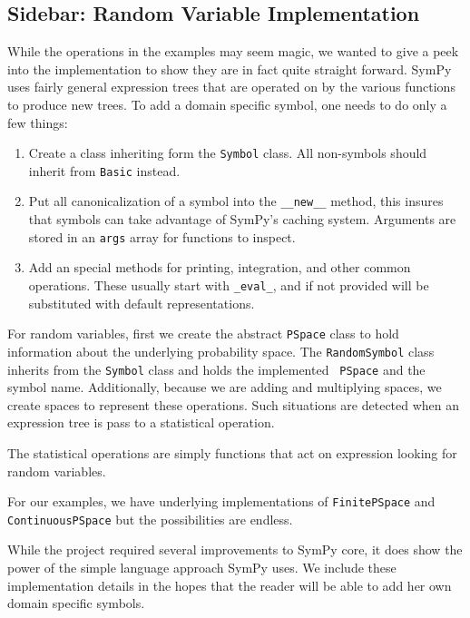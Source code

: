 \subsection{Sidebar: Random Variable Implementation}

While the operations in the examples may seem magic, we wanted to give a peek
into the implementation to show they are in fact quite straight forward. SymPy
uses fairly general expression trees that are operated on by the various
functions to produce new trees.  To add a domain specific symbol, one needs to
do only a few things:

\begin{enumerate}
\item Create a class inheriting form the {\tt Symbol} class. All non-symbols should
  inherit from {\tt Basic} instead.
\item Put all canonicalization of a symbol into the {\tt \_\_new\_\_} method, this
  insures that symbols can take advantage of SymPy's caching system.  Arguments
  are stored in an {\tt args} array for functions to inspect.
\item Add an special methods for printing, integration, and other common
  operations.  These usually start with {\tt \_eval\_}, and if not provided will
  be substituted with default representations.
\end{enumerate}

For random variables, first we create the abstract {\tt PSpace} class to hold
information about the underlying probability space.  The {\tt RandomSymbol}
class inherits from the {\tt Symbol} class and holds the implemented {\tt
  PSpace} and the symbol name. Additionally, because we are adding and
multiplying spaces, we create spaces to represent these operations.  Such
situations are detected when an expression tree is pass to a statistical operation.

The statistical operations are simply functions that act on expression looking
for random variables.

For our examples, we have underlying implementations of {\tt FinitePSpace} and
{\tt ContinuousPSpace} but the possibilities are endless.

While the project required several improvements to SymPy core, it does show the
power of the simple language approach SymPy uses.  We include these
implementation details in the hopes that the reader will be able to add her own
domain specific symbols.
